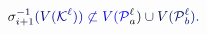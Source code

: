 \documentclass[12pt]{article}
\begin{document}
\makeatletter
\renewcommand*{\@textcolor}[3]{%
  \protect\leavevmode
  \begingroup
    \color#1{#2}#3%
  \endgroup
}
\makeatother
\begin{displaymath}
\mathcolor[RGB]{0,0,15}{\sigma} _ { \mathcolor[RGB]{0,0,30}{i} \mathcolor[RGB]{0,0,45}{+} \mathcolor[RGB]{0,0,60}{1} } ^ { \mathcolor[RGB]{0,0,75}{-} \mathcolor[RGB]{0,0,90}{1} } \mathcolor[RGB]{0,0,105}{(} \mathcolor[RGB]{0,0,120}{V} \mathcolor[RGB]{0,0,135}{(} \mathcal { \mathcolor[RGB]{0,0,150}{K} } ^ { \mathcolor[RGB]{0,0,165}{\ell} } \mathcolor[RGB]{0,0,180}{)} \mathcolor[RGB]{0,0,195}{)} \mathcolor[RGB]{0,0,210}{\not\subset} \mathcolor[RGB]{0,0,225}{V} \mathcolor[RGB]{0,0,240}{(} \mathcal { \mathcolor[RGB]{0,0,255}{P} } _ { \mathcolor[RGB]{0,15,0}{a} } ^ { \mathcolor[RGB]{0,15,15}{\ell} } \mathcolor[RGB]{0,15,30}{)} \mathcolor[RGB]{0,15,45}{\cup} \mathcolor[RGB]{0,15,60}{V} \mathcolor[RGB]{0,15,75}{(} \mathcal { \mathcolor[RGB]{0,15,90}{P} } _ { \mathcolor[RGB]{0,15,105}{b} } ^ { \mathcolor[RGB]{0,15,120}{\ell} } \mathcolor[RGB]{0,15,135}{)} \mathcolor[RGB]{0,15,150}{.}
\end{displaymath}
\end{document}
